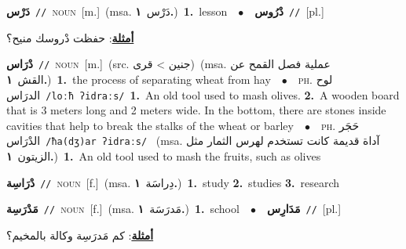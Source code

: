 \documentclass[10pt,a4paper,twoside]{article} %
\begin{document}
\begin{multicols}{2}
{\setlength\topsep{0pt}\textbf{\foreignlanguage{arabic}{دَرْس}}\ {\color{gray}\texttt{//}\color{black}}\ \textsc{noun}\ [m.]\ \color{gray}(msa. \foreignlanguage{arabic}{دَرْس}~\foreignlanguage{arabic}{\textbf{١.}})\color{black}\ \textbf{1.}~lesson\ \ $\bullet$\ \ \setlength\topsep{0pt}\textbf{\foreignlanguage{arabic}{دْرُوس}}\ {\color{gray}\texttt{//}\color{black}}\ [pl.]\  \begin{flushright}\color{gray}\foreignlanguage{arabic}{\textbf{\underline{\foreignlanguage{arabic}{أمثلة}}}: حفظت دْروسك منيح؟}\end{flushright}\color{black}} \vspace{2mm}

{\setlength\topsep{0pt}\textbf{\foreignlanguage{arabic}{دْرَاس}}\ {\color{gray}\texttt{//}\color{black}}\ \textsc{noun}\ [m.]\ (src. \color{gray}\foreignlanguage{arabic}{جنين > قرى}\color{black})\ \color{gray}(msa. \foreignlanguage{arabic}{عملية فصل القمح عن القش}~\foreignlanguage{arabic}{\textbf{١.}})\color{black}\ \textbf{1.}~the process of separating wheat from hay\ \ $\bullet$\ \ \textsc{ph.} \color{gray} \foreignlanguage{arabic}{لوح الدرَاس}\color{black}\ {\color{gray}\texttt{/{\sffamily loːħ ʔidraːs}/}\color{black}}\ \textbf{1.}~An old tool used to mash olives.  \textbf{2.}~A wooden board that  is 3 meters long and 2 meters wide. In the bottom, there are stones inside cavities that help to break the stalks of the wheat or barley\ \ $\bullet$\ \ \textsc{ph.} \color{gray} \foreignlanguage{arabic}{حَجَر الدْرَاس}\color{black}\ {\color{gray}\texttt{/{\sffamily ħa(dʒ)ar ʔidraːs}/}\color{black}}\ \color{gray} (msa. \foreignlanguage{arabic}{آداة قديمة كانت تستخدم لهرس الثمار مثل الزيتون}~\foreignlanguage{arabic}{\textbf{١.}})\color{black}\ \textbf{1.}~An old tool used to mash the fruits, such as olives\ } \vspace{2mm}

{\setlength\topsep{0pt}\textbf{\foreignlanguage{arabic}{دْرَاسِة}}\ {\color{gray}\texttt{//}\color{black}}\ \textsc{noun}\ [f.]\ \color{gray}(msa. \foreignlanguage{arabic}{دِراسَة}~\foreignlanguage{arabic}{\textbf{١.}})\color{black}\ \textbf{1.}~study  \textbf{2.}~studies  \textbf{3.}~research\ } \vspace{2mm}

{\setlength\topsep{0pt}\textbf{\foreignlanguage{arabic}{مَدْرَسِة}}\ {\color{gray}\texttt{//}\color{black}}\ \textsc{noun}\ [f.]\ \color{gray}(msa. \foreignlanguage{arabic}{مَدرَسَة}~\foreignlanguage{arabic}{\textbf{١.}})\color{black}\ \textbf{1.}~school\ \ $\bullet$\ \ \setlength\topsep{0pt}\textbf{\foreignlanguage{arabic}{مَدَارِس}}\ {\color{gray}\texttt{//}\color{black}}\ [pl.]\  \begin{flushright}\color{gray}\foreignlanguage{arabic}{\textbf{\underline{\foreignlanguage{arabic}{أمثلة}}}: كم مَدرَسِة وكالة بالمخيم؟}\end{flushright}\color{black}} \vspace{2mm}


\end{multicols}
\end{document}
